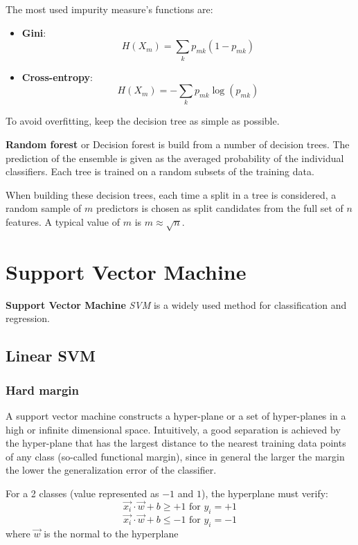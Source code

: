 The most used impurity measure's functions are:
\begin{itemize}
    \item \textbf{Gini}: $$H(X_m) = \sum_k p_{mk} (1 - p_{mk})$$
    \item \textbf{Cross-entropy}: $$ H(X_m) = - \sum_k p_{mk} \log(p_{mk}) $$
\end{itemize}

To avoid overfitting, keep the decision tree as simple as possible.

\textbf{Random forest} or Decision forest is build from a number of decision trees. The prediction of the ensemble is given as the averaged probability of the individual classifiers. Each tree is trained on a random subsets of the training data.

When building these decision trees, each time a split in a tree is considered, a random sample of $m$ predictors is chosen as split candidates from the full set of $n$ features. A typical value of $m$ is $m \approx \sqrt{n}$.

\section{Support Vector Machine}


\textbf{Support Vector Machine} \textit{SVM} is a widely used method for classification and regression.

\subsection{Linear SVM}
\subsubsection{Hard margin}

A support vector machine constructs a hyper-plane or a set of hyper-planes in a high or infinite dimensional space. Intuitively, a good separation is achieved by the hyper-plane that has the largest distance to the nearest training data points of any class (so-called functional margin), since in general the larger the margin the lower the generalization error of the classifier.

For a 2 classes (value represented as $-1$ and $1$), the hyperplane must verify:
\begin{equation}\label{eq:svm_1}
    \vec{x_i} \cdot \vec{w} + b \geq + 1 \text{ for } y_i = + 1
\end{equation}
\begin{equation}\label{eq:svm_2}
    \vec{x_i} \cdot \vec{w} + b \leq -1 \text{ for } y_i = - 1
\end{equation}
where $\vec{w}$ is the normal to the hyperplane

